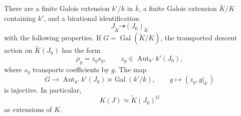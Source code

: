 \begin{lemma}
\label{ds:cocycle}
There are a finite Galois extension $k'/k$ in $\overline k$, a finite
Galois extension $\widetilde K/K$ containing $k'$, and a birational
identification
\[
 J_{\widetilde K}\dashrightarrow (J_0)_{\widetilde K}
\]
with the following properties.  If $G=\operatorname{Gal}(\widetilde K/K)$,
the transported descent action on $\widetilde K(J_0)$ has the form
\begin{equation}
 \rho_g=z_g s_g,
 \qquad
 z_g\in\operatorname{Aut}_{k'} k'(J_0),
 \label{ds:semilinear}
\end{equation}
where $s_g$ transports coefficients by $g$.  The map
\begin{equation}
 G\longrightarrow
 \operatorname{Aut}_{k'} k'(J_0)
       \rtimes\operatorname{Gal}(k'/k),
 \qquad
 g\longmapsto(z_g,g|_{k'})
 \label{ds:faithful-pairs}
\end{equation}
is injective.  In particular,
\begin{equation}
 K(J)\simeq \widetilde K(J_0)^G
 \label{ds:split-field}
\end{equation}
as extensions of $K$.
\end{lemma}

